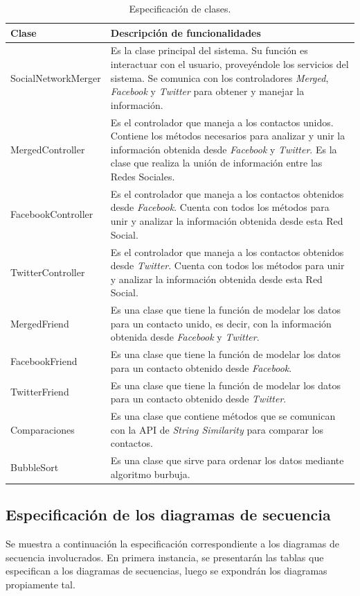 \begin{table}[H]
\begin{center}
\caption[Especificación de clases.]{Especificación de clases.}
\label{tab:des-tab23}
\begin{tabular}{|l|>{\raggedright}p{7cm}|}
\hline 
Clase & Descripción de funcionalidades\tabularnewline
\hline 
\hline 
SocialNetworkMerger & Es la clase principal del sistema. Su función es interactuar con el
usuario, proveyéndole los servicios del sistema. Se comunica con los
controladores \emph{Merged}, \emph{Facebook} y \emph{Twitter} para
obtener y manejar la información.\tabularnewline
\hline 
MergedController & Es el controlador que maneja a los contactos unidos. Contiene los
métodos necesarios para analizar y unir la información obtenida desde
\emph{Facebook }y \emph{Twitter}. Es la clase que realiza la unión
de información entre las Redes Sociales.\tabularnewline
\hline 
FacebookController & Es el controlador que maneja a los contactos obtenidos desde\emph{
Facebook}. Cuenta con todos los métodos para unir y analizar la información
obtenida desde esta Red Social.\tabularnewline
\hline 
TwitterController & Es el controlador que maneja a los contactos obtenidos desde \emph{Twitter}.
Cuenta con todos los métodos para unir y analizar la información obtenida
desde esta Red Social.\tabularnewline
\hline 
MergedFriend & Es una clase que tiene la función de modelar los datos para un contacto
unido, es decir, con la información obtenida desde \emph{Facebook}
y \emph{Twitter}.\tabularnewline
\hline 
FacebookFriend & Es una clase que tiene la función de modelar los datos para un contacto
obtenido desde \emph{Facebook}. \tabularnewline
\hline 
TwitterFriend & Es una clase que tiene la función de modelar los datos para un contacto
obtenido desde \emph{Twitter}.\tabularnewline
\hline 
Comparaciones & Es una clase que contiene métodos que se comunican con la API de\emph{
String Similarity} para comparar los contactos.\tabularnewline
\hline 
BubbleSort & Es una clase que sirve para ordenar los datos mediante algoritmo burbuja.\tabularnewline
\hline 
\end{tabular}
\end{center}
\end{table}

\subsection{Especificación de los diagramas de secuencia}

Se muestra a continuación la especificación correspondiente a los diagramas de secuencia involucrados. En primera instancia, se presentarán las tablas que especifican a los diagramas de secuencias, luego se expondrán los diagramas propiamente tal.

